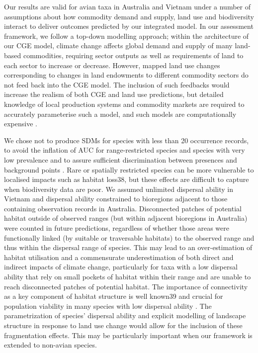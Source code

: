 Our results are valid for avian taxa in Australia and Vietnam under a number of assumptions about how commodity demand and supply, land use and biodiversity interact to deliver outcomes predicted by our integrated model. In our assessment framework, we follow a top-down modelling approach; within the architecture of our CGE model, climate change affects global demand and supply of many land-based commodities, requiring sector outputs as well as requirements of land to each sector to increase or decrease. However, mapped land use changes corresponding to changes in land endowments to different commodity sectors do not feed back into the CGE model. The inclusion of such feedbacks would increase the realism of both CGE and land use predictions, but detailed knowledge of local production systems and commodity markets are required to accurately parameterise such a model, and such models are computationally expensive \citep{bryan_land-use_2016}.

We chose not to produce SDMs for species with less than 20 occurrence records, to avoid the inflation of AUC for range-restricted species and species with very low prevalence \citep{van_proosdij_minimum_2016} and to assure sufficient discrimination between presences and background points \citep{hernandez_effect_2006, wisz_effects_2008}. Rare or spatially restricted species can be more vulnerable to localised impacts such as habitat loss38, but these effects are difficult to capture when biodiversity data are poor. We assumed unlimited dispersal ability in Vietnam and dispersal ability constrained to bioregions adjacent to those containing observation records in Australia. Disconnected patches of potential habitat outside of observed ranges (but within adjacent bioregions in Australia) were counted in future predictions, regardless of whether those areas were functionally linked (by suitable or traversable habitats) to the observed range and thus within the dispersal range of species. This may lead to an over-estimation of habitat utilisation and a commensurate underestimation of both direct and indirect impacts of climate change, particularly for taxa with a low dispersal ability that rely on small pockets of habitat within their range and are unable to reach disconnected patches of potential habitat. The importance of connectivity as a key component of habitat structure is well known39 and crucial for population viability in many species with low dispersal ability \citep{gordon_use_2012, cadenhead_climate_2016}. The parametrization of species’ dispersal ability and explicit modelling of landscape structure in response to land use change would allow for the inclusion of these fragmentation effects. This may be particularly important when our framework is extended to non-avian species.

